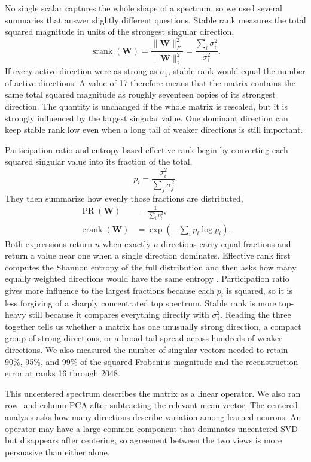 \documentclass[11pt]{article}
\newcommand{\mat}[1]{\mathbf{#1}}
\begin{document}
No single scalar captures the whole shape of a spectrum, so we used several summaries that answer slightly different questions. Stable rank measures the total squared magnitude in units of the strongest singular direction,
\begin{equation}
\operatorname{srank}(\mat{W})=
\frac{\|\mat{W}\|_F^2}{\|\mat{W}\|_2^2}
=\frac{\sum_i\sigma_i^2}{\sigma_1^2}.
\end{equation}
If every active direction were as strong as $\sigma_1$, stable rank would equal the number of active directions. A value of 17 therefore means that the matrix contains the same total squared magnitude as roughly seventeen copies of its strongest direction. The quantity is unchanged if the whole matrix is rescaled, but it is strongly influenced by the largest singular value. One dominant direction can keep stable rank low even when a long tail of weaker directions is still important.

Participation ratio and entropy-based effective rank begin by converting each squared singular value into its fraction of the total,
\begin{equation}
p_i=\frac{\sigma_i^2}{\sum_j\sigma_j^2}.
\end{equation}
They then summarize how evenly those fractions are distributed,
\begin{align}
\operatorname{PR}(\mat{W})&=\frac{1}{\sum_i p_i^2},\\
\operatorname{erank}(\mat{W})&=\exp\!\left(-\sum_i p_i\log p_i\right).
\end{align}
Both expressions return $n$ when exactly $n$ directions carry equal fractions and return a value near one when a single direction dominates. Effective rank first computes the Shannon entropy of the full distribution and then asks how many equally weighted directions would have the same entropy \cite{roy2007}. Participation ratio gives more influence to the largest fractions because each $p_i$ is squared, so it is less forgiving of a sharply concentrated top spectrum. Stable rank is more top-heavy still because it compares everything directly with $\sigma_1^2$. Reading the three together tells us whether a matrix has one unusually strong direction, a compact group of strong directions, or a broad tail spread across hundreds of weaker directions. We also measured the number of singular vectors needed to retain 90\%, 95\%, and 99\% of the squared Frobenius magnitude and the reconstruction error at ranks 16 through 2048.

This uncentered spectrum describes the matrix as a linear operator. We also ran row- and column-PCA after subtracting the relevant mean vector. The centered analysis asks how many directions describe variation among learned neurons. An operator may have a large common component that dominates uncentered SVD but disappears after centering, so agreement between the two views is more persuasive than either alone.
\end{document}
